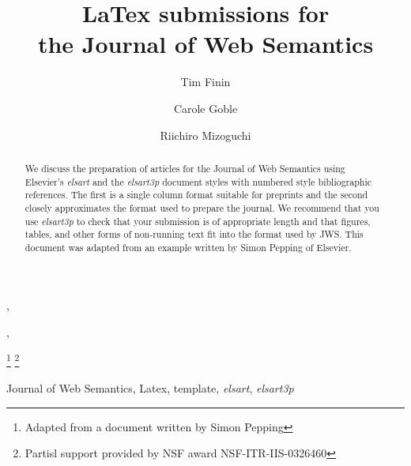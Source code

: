 \documentclass{elsart3p}    %
\begin{document}
\begin{frontmatter}


\title{LaTex submissions for \\ the Journal of Web Semantics}


\author[umbc]{Tim Finin},
\author[man]{Carole Goble},
\author[osaka]{Riichiro Mizoguchi}


\thanks[titleNote]{Adapted from a document written by Simon Pepping}
\thanks[fininGrants]{Partisl support provided by NSF award NSF-ITR-IIS-0326460} 

\medskip


\address[umbc]{University of Maryland, Baltimore County, Baltimore MD 21250, USA}
\address[man]{University of Manchester, Manchester, M13 9PL, UK}
\address[osaka]{Osaka University, 8-1 Mihogaoka, Ibaraki, Osaka, 567-0047 Japan}

\begin{abstract} 

We discuss the preparation of articles for the Journal of
Web Semantics using Elsevier's {\em elsart} and the
{\em elsart3p} document styles with numbered style
bibliographic references.  The first is a single column
format suitable for preprints and the second closely
approximates the format used to prepare the journal.  We
recommend that you use {\em elsart3p} to check that your
submission is of appropriate length and that figures,
tables, and other forms of non-running text fit into the
format used by JWS.  This document was adapted from an
example written by Simon Pepping of Elsevier.

\end{abstract}


\begin{keyword}
 Journal of Web Semantics, Latex, template, {\em elsart}, {\em elsart3p}
\end{keyword}

\end{frontmatter}
\end{document}
